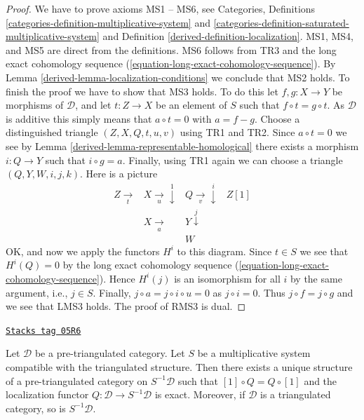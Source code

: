 \begin{proof}

We have to prove axioms MS1 -- MS6, see
Categories, Definitions \ref{categories-definition-multiplicative-system} and
\ref{categories-definition-saturated-multiplicative-system}
and
Definition \ref{derived-definition-localization}.
MS1, MS4, and MS5 are direct from the definitions.
MS6 follows from TR3 and the long exact cohomology sequence
(\ref{equation-long-exact-cohomology-sequence}).
By
Lemma \ref{derived-lemma-localization-conditions}
we conclude that MS2 holds. To finish the proof we have to show that
MS3 holds. To do this let $f, g : X \to Y$ be morphisms of $\mathcal{D}$,
and let $t : Z \to X$ be an element of $S$ such that $f \circ t = g \circ t$.
As $\mathcal{D}$ is additive this simply means that $a \circ t = 0$ with
$a = f - g$. Choose a distinguished triangle $(Z, X, Q, t, u, v)$ using
TR1 and TR2. Since $a \circ t = 0$ we see by
Lemma \ref{derived-lemma-representable-homological}
there exists a morphism $i : Q \to Y$ such that $i \circ g = a$.
Finally, using TR1 again we can choose a triangle
$(Q, Y, W, i, j, k)$. Here is a picture
$$
\begin{array}{cccc}Z \underset{t}{\longrightarrow} & X \underset{u}{\longrightarrow}\overset{1}{\downarrow} & Q \underset{v}{\longrightarrow}\overset{i}{\downarrow} & Z[1] \\  & X \underset{a}{\longrightarrow} & Y \overset{j}{\downarrow} &  \\  &  & W & \end{array}
$$
OK, and now we apply the functors $H^i$ to this diagram.
Since $t \in S$ we see that $H^i(Q) = 0$ by the long exact cohomology
sequence (\ref{equation-long-exact-cohomology-sequence}).
Hence $H^i(j)$ is an isomorphism for all $i$ by the same argument,
i.e., $j \in S$. Finally, $j \circ a = j \circ i \circ u = 0$ as
$j \circ i = 0$. Thus $j \circ f = j \circ g$ and we see that LMS3 holds.
The proof of RMS3 is dual.
\end{proof}

\begin{proposition}
\label{derived-proposition-construct-localization}
\href{https://stacks.math.columbia.edu/tag/05R6}{\texttt{Stacks tag 05R6}}

Let $\mathcal{D}$ be a pre-triangulated category. Let $S$ be a multiplicative
system compatible with the triangulated structure.
Then there exists a unique structure of a pre-triangulated category on
$S^{-1}\mathcal{D}$ such that $[1] \circ Q = Q \circ [1]$ and
the localization functor $Q : \mathcal{D} \to S^{-1}\mathcal{D}$ is exact.
Moreover, if $\mathcal{D}$ is a triangulated category, so is
$S^{-1}\mathcal{D}$.
\end{proposition}

